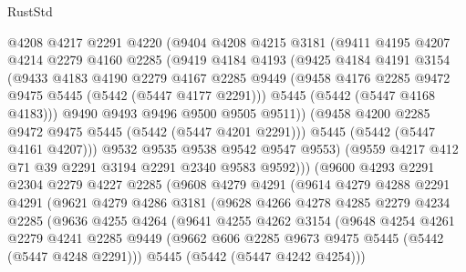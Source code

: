 \begin{lexlean}{RustStd}
\begin{coremodule}
              @4208
              @4217
              @2291
              @4220
              (@9404
                @4208
                @4215
                @3181
                (@9411
                  @4195
                  @4207
                  @4214
                  @2279
                  @4160
                  @2285
                  (@9419
                    @4184
                    @4193
                    (@9425
                      @4184
                      @4191
                      @3154
                      (@9433
                        @4183
                        @4190
                        @2279
                        @4167
                        @2285
                        @9449
                        (@9458 @4176 @2285 @9472 @9475 @5445 (@5442 (@5447 @4177 @2291)))
                        @5445
                        (@5442 (@5447 @4168 @4183)))
                      @9490
                      @9493
                      @9496
                      @9500
                      @9505
                      @9511))
                  (@9458 @4200 @2285 @9472 @9475 @5445 (@5442 (@5447 @4201 @2291)))
                  @5445
                  (@5442 (@5447 @4161 @4207)))
                @9532
                @9535
                @9538
                @9542
                @9547
                @9553)
              (@9559 @4217 @412 @71 @39 @2291 @3194 @2291 @2340 @9583 @9592)))
          (@9600
            @4293
            @2291
            @2304
            @2279
            @4227
            @2285
            (@9608
              @4279
              @4291
              (@9614
                @4279
                @4288
                @2291
                @4291
                (@9621
                  @4279
                  @4286
                  @3181
                  (@9628
                    @4266
                    @4278
                    @4285
                    @2279
                    @4234
                    @2285
                    (@9636
                      @4255
                      @4264
                      (@9641
                        @4255
                        @4262
                        @3154
                        (@9648
                          @4254
                          @4261
                          @2279
                          @4241
                          @2285
                          @9449
                          (@9662 @606 @2285 @9673 @9475 @5445 (@5442 (@5447 @4248 @2291)))
                          @5445
                          (@5442 (@5447 @4242 @4254)))

\end{coremodule}
\end{lexlean}
